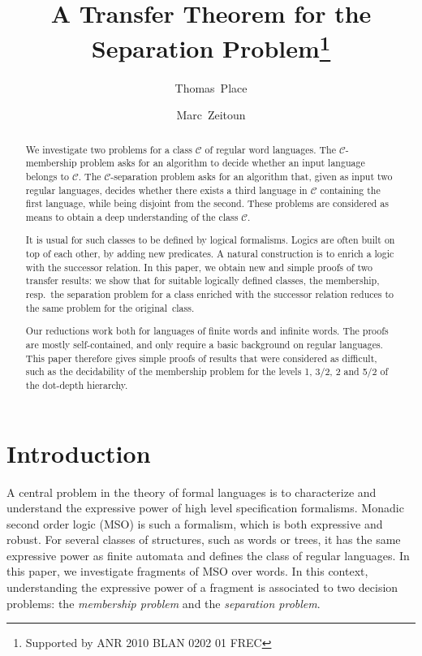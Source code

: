 \documentclass[a4paper,USenglish]{lipics}
\title{A Transfer Theorem for the Separation Problem\footnote{Supported by ANR 2010 BLAN 0202 01 FREC}}
\author{Thomas~Place}
\author{Marc~Zeitoun}
\affil{LaBRI, Bordeaux University, France, \texttt{firstname.lastname@labri.fr}.}
\newcommand\Cs{\ensuremath{\mathcal{C}}\xspace}
\theoremstyle{plain}
\begin{document}
\maketitle

\begin{abstract}
  We investigate two problems for a class \Cs of regular word languages. The
  \Cs-membership problem asks for an algorithm to decide whether an input
  language belongs to \Cs. The \Cs-separation problem asks for an algorithm
  that, given as input two regular languages, decides whether there exists a
  third language in \Cs containing the first language, while being disjoint
  from the second. These problems are considered as means to obtain a deep
  understanding of the class \Cs.

  It is usual for such classes to be defined by logical formalisms. Logics are
  often built on top of each other, by adding new predicates. A natural
  construction is to enrich a logic with the successor
  relation.     In this paper, we obtain new and simple proofs of two transfer
  results: we show that for suitable logically defined classes, the
  membership, resp.\ the separation problem for a class enriched with the
  successor relation reduces to the same problem for the original~class.


  Our reductions work both for languages of finite words and infinite
  words.   The proofs are mostly self-contained, and only require a basic background
  on regular languages. This paper therefore gives simple proofs of
  results that were considered as difficult, such as the decidability of the
  membership problem for the levels 1, 3/2, 2 and 5/2 of the dot-depth
  hierarchy.
\end{abstract}

\section{Introduction}
\label{sec:intro}
A central problem in the theory of formal languages is to
characterize and understand the expressive power of high level specification
formalisms. Monadic second order logic (MSO) is such a formalism, which is
both expressive and robust. For several classes of structures, such as words
or trees, it has the same expressive power as finite automata and defines the
class of regular languages. In this paper, we investigate fragments of MSO
over words. In this context, understanding the expressive power of a fragment
is associated to two decision problems: the \emph{membership problem} and the
\emph{separation problem}.
\end{document}
